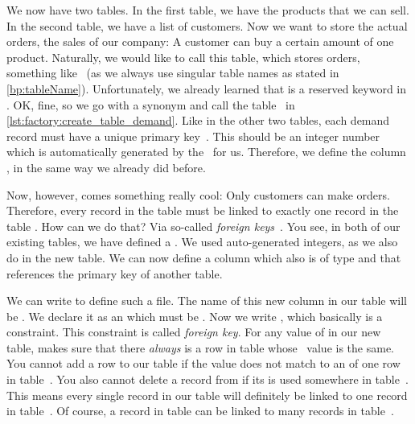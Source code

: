 %
\endhsection%
\FloatBarrier%
\endhsection%
%
We now have two tables.
In the first table, we have the products that we can sell.
In the second table, we have a list of customers.
Now we want to store the actual orders, the sales of our company:
A customer can buy a certain amount of one product.%
%
%
%
%
Naturally, we would like to call this table, which stores orders, something like~ (as we always use singular table names as stated in \cref{bp:tableName}).
Unfortunately, we already learned that  is a reserved keyword in \sql.%
%
%
%
OK, fine, so we go with a synonym and call the table~ in \cref{lst:factory:create_table_demand}.
Like in the other two tables, each demand record must have a unique primary key~.
This should be an integer number which is automatically generated by the \db\ for us.
Therefore, we define the column , in the same way we already did before.

Now, however, comes something really cool:
Only customers can make orders.
Therefore, every record in the table  must be linked to exactly one record in the table .
How can we do that?
Via so-called \emph{foreign keys}~\cite{PGDG:PD:FK}.
You see, in both of our existing tables, we have defined a .
We used auto-generated integers, as we also do in the new table.
We can now define a column which also is of type  and that references the primary key of another table.

We can write  to define such a file.
The name of this new column in our table  will be .
We declare it as an  which must be .
Now we write , which basically is a constraint.
This constraint is called \emph{foreign key}.
For any value of  in our new table, makes sure that there \emph{always} is a row in table  whose ~value is the same.
You cannot add a row to our table  if the  value does not match to an  of one row in table~.
You also cannot delete a record from  if its  is used somewhere in table~.
This means every single record in our table  will definitely be linked to one record in table~.
Of course, a record in table  can be linked to many records in table~.

